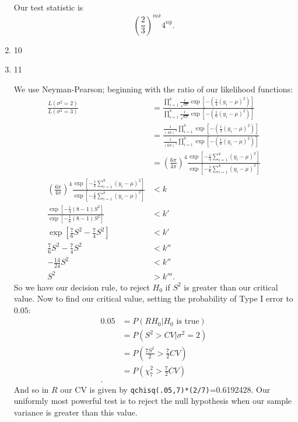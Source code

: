 \documentclass{article}
\begin{document}
\begin{enumerate}
        Our test statistic is
        \[
            \left( \frac{2}{3} \right) ^{m\bar{x}}4^{n\bar{y}}
        .\] 
    \item 10
    \item 11

        We use Neyman-Pearson; beginning with the ratio of our likelihood functions:
        \begin{align*}
            \frac{L(\sigma^2=2)}{L(\sigma^2=3)}&= \frac{\prod_{i=1}^{8} \frac{1}{\sqrt{4\pi} }\exp\left[ -\left( \frac{1}{4}(y_{i}-\mu)^2 \right)  \right] 
             }{\prod_{i=1}^{8} \frac{1}{\sqrt{6\pi} }\exp\left[ -\left( \frac{1}{6}(y_{i}-\mu)^2 \right)  \right] } \\
                &= \frac{ \frac{1}{(4\pi)^{4}}\prod_{i=1}^{8}\exp\left[ -\left( \frac{1}{4}(y_{i}-\mu)^2 \right)  \right] 
             }{ \frac{1}{(6\pi)^{4}}\prod_{i=1}^{8}\exp\left[ -\left( \frac{1}{6}(y_{i}-\mu)^2 \right)  \right] } \\
             &= \left( \frac{6\pi}{4\pi} \right) ^{4}\frac{\exp\left[ -\frac{1}{4}\sum_{i=1}^{8} (y_{i}-\mu)^2\right] 
             }{\exp\left[ -\frac{1}{6}\sum_{i=1}^{8} (y_{i}-\mu)^2 \right] 
             } \\
             \left( \frac{6\pi}{4\pi} \right) ^{4}\frac{\exp\left[ -\frac{1}{4}\sum_{i=1}^{8} (y_{i}-\mu)^2\right] 
             }{\exp\left[ -\frac{1}{6}\sum_{i=1}^{8} (y_{i}-\mu)^2 \right] }&<k \\
             \frac{\exp\left[ -\frac{1}{4}(8-1)S^2\right] 
             }{\exp\left[ -\frac{1}{6}(8-1)S^2 \right] }&<k' \\
             \exp\left[ \frac{7}{6}S^2-\frac{7}{4}S^2 \right] &<k'\\
             \frac{7}{6}S^2-\frac{7}{4}S^2 &<k''\\
             -\frac{14}{24}S^2&<k''\\
             S^2&>k'''
        .\end{align*}
        So we have our decision rule, to reject $H_0$ if $S^2$ is greater than our critical value. Now to find our critical value,
        setting the probability of Type I error to $0.05$:
        \begin{align*}
            0.05&= P(RH_0|H_0 \text{ is true})\\
            &= P(S^2>CV|\sigma ^2=2) \\
            &= P(\frac{7S^2}{2}>\frac{7}{2}CV) \\
            &= P(\chi^2_{7}>\frac{7}{2}CV) \\
        .\end{align*}
        And so in $R$ our CV is given by \verb|qchisq(.05,7)*(2/7)|=0.6192428. Our uniformly most powerful test is to reject the null hypothesis when our sample
        variance is greater than this value.
\end{enumerate}
\end{document}
